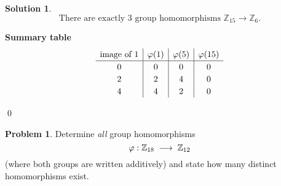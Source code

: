 \documentclass[12pt]{article}
\theoremstyle{definition} %
\newtheorem{solution}{Solution}
\newtheorem{problem}{Problem}
\theoremstyle{plain} %
\begin{document}
\begin{solution}
\[
   \boxed{\text{There are exactly $3$ group homomorphisms } \mathbb{Z}_{15}\to\mathbb{Z}_{6}.}
\]

\bigskip
\noindent
\textbf{Summary table}
\[
\renewcommand{\arraystretch}{1.2}
\begin{array}{c|c|c|c}
\text{image of $1$} & \varphi(1) & \varphi(5) & \varphi(15)\rule[-4pt]{0pt}{14pt}\\\hline
0 & 0 & 0 & 0\\
2 & 2 & 4 & 0\\
4 & 4 & 2 & 0
\end{array}
\]

\qed
\end{solution}
\begin{problem}
  Determine \emph{all} group homomorphisms 
  \[
        \varphi : \Bbb Z_{18}\;\longrightarrow\;\Bbb Z_{12}
  \]
  (where both groups are written additively) and state how many distinct
  homomorphisms exist.
  \end{problem}
\end{document}
